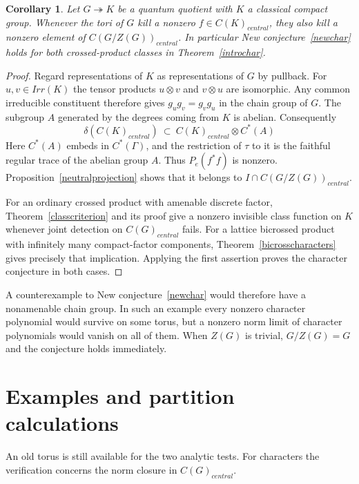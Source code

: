 \documentclass[11pt,a4paper]{article}
\newtheorem{cor}[thm]{Corollary}
\theoremstyle{remark}
\begin{document}
\begin{cor}\label{classicalneutral}
Let $G\twoheadrightarrow K$ be a quantum quotient with $K$ a classical compact group. Whenever the
tori of $G$ kill a nonzero $f\in C(K)_{central}$, they also kill a nonzero
element of $C(G/Z(G))_{central}$. In particular New conjecture~\ref{newchar} holds
for both crossed-product classes in Theorem~\ref{introchar}.
\end{cor}
\begin{proof}
Regard representations of $K$ as representations of $G$ by pullback.
For $u,v\in Irr(K)$ the tensor products $u\otimes v$ and $v\otimes u$
are isomorphic. Any common irreducible constituent therefore gives
$g_u g_v=g_v g_u$ in the chain group of $G$. The subgroup $A$ generated
by the degrees coming from $K$ is abelian. Consequently
\[
 \delta(C(K)_{central})\ \subset\ C(K)_{central}\otimes C^*(A)
\]
Here $C^*(A)$ embeds in $C^*(\Gamma)$, and the restriction of $\tau$
to it is the faithful regular trace of the abelian group $A$.
Thus $P_e(f^*f)$ is nonzero. Proposition~\ref{neutralprojection} shows
that it belongs to $I\cap C(G/Z(G))_{central}$.

For an ordinary crossed product with amenable discrete factor,
Theorem~\ref{classcriterion} and its proof give a nonzero invisible
class function on $K$ whenever joint detection on $C(G)_{central}$ fails. For a
lattice bicrossed product with infinitely many compact-factor components,
Theorem~\ref{bicrosscharacters} gives precisely that implication. Applying
the first assertion proves the character conjecture in both cases.
\end{proof}

A counterexample to New conjecture~\ref{newchar} would therefore have
a nonamenable chain group. In such an example every nonzero character polynomial would survive on
some torus, but a nonzero norm limit of character polynomials would
vanish on all of them. When $Z(G)$ is trivial, $G/Z(G)=G$ and the
conjecture holds immediately.

\section{Examples and partition calculations}\label{sectests}

An old torus is still available for the two analytic tests. For
characters the verification concerns the norm closure in $C(G)_{central}$.
\end{document}
